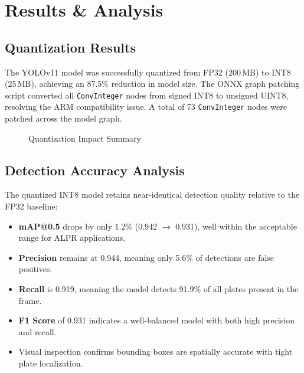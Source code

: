 \documentclass[11pt]{report}
\begin{document}
\chapter{Results \& Analysis}

\section{Quantization Results}
The YOLOv11 model was successfully quantized from FP32 (200\,MB) to INT8 (25\,MB), achieving an 87.5\% reduction in model size. The ONNX graph patching script converted all \texttt{ConvInteger} nodes from signed INT8 to unsigned UINT8, resolving the ARM compatibility issue. A total of 73 \texttt{ConvInteger} nodes were patched across the model graph.

\begin{figure}[H]
\centering
{}
\caption{Quantization Impact Summary}
\label{fig:quant_summary}
\end{figure}

\section{Detection Accuracy Analysis}
The quantized INT8 model retains near-identical detection quality relative to the FP32 baseline:
\begin{itemize}
    \item \textbf{mAP@0.5} drops by only 1.2\% (0.942 $\to$ 0.931), well within the acceptable range for ALPR applications.
    \item \textbf{Precision} remains at 0.944, meaning only 5.6\% of detections are false positives.
    \item \textbf{Recall} is 0.919, meaning the model detects 91.9\% of all plates present in the frame.
    \item \textbf{F1 Score} of 0.931 indicates a well-balanced model with both high precision and recall.
    \item Visual inspection confirms bounding boxes are spatially accurate with tight plate localization.
\end{itemize}
\end{document}
